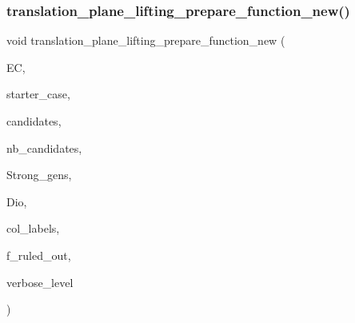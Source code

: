 \subsubsection{\texorpdfstring{translation\+\_\+plane\+\_\+lifting\+\_\+prepare\+\_\+function\+\_\+new()}{translation\_plane\_lifting\_prepare\_function\_new()}}
{\footnotesize\ttfamily void translation\+\_\+plane\+\_\+lifting\+\_\+prepare\+\_\+function\+\_\+new (\begin{DoxyParamCaption}\item[{\mbox{\hyperlink{classexact__cover}{exact\+\_\+cover}} $\ast$}]{EC,  }\item[{\mbox{\hyperlink{galois_8h_a09fddde158a3a20bd2dcadb609de11dc}{I\+NT}}}]{starter\+\_\+case,  }\item[{\mbox{\hyperlink{galois_8h_a09fddde158a3a20bd2dcadb609de11dc}{I\+NT}} $\ast$}]{candidates,  }\item[{\mbox{\hyperlink{galois_8h_a09fddde158a3a20bd2dcadb609de11dc}{I\+NT}}}]{nb\+\_\+candidates,  }\item[{\mbox{\hyperlink{classstrong__generators}{strong\+\_\+generators}} $\ast$}]{Strong\+\_\+gens,  }\item[{\mbox{\hyperlink{classdiophant}{diophant}} $\ast$\&}]{Dio,  }\item[{\mbox{\hyperlink{galois_8h_a09fddde158a3a20bd2dcadb609de11dc}{I\+NT}} $\ast$\&}]{col\+\_\+labels,  }\item[{\mbox{\hyperlink{galois_8h_a09fddde158a3a20bd2dcadb609de11dc}{I\+NT}} \&}]{f\+\_\+ruled\+\_\+out,  }\item[{\mbox{\hyperlink{galois_8h_a09fddde158a3a20bd2dcadb609de11dc}{I\+NT}}}]{verbose\+\_\+level }\end{DoxyParamCaption})}


